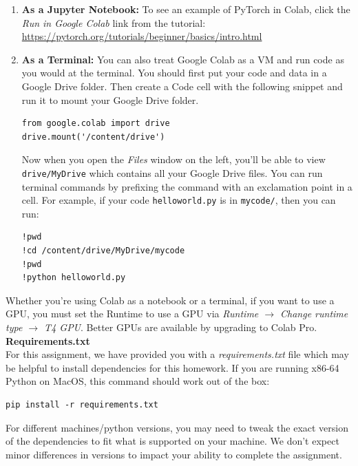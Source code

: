 \documentclass[11pt,addpoints,answers]{exam}
\begin{document}
\begin{enumerate}
\item \textbf{As a Jupyter Notebook:} To see an example of PyTorch in Colab, click the \emph{Run in Google Colab} link from the tutorial: \url{https://pytorch.org/tutorials/beginner/basics/intro.html}

\item \textbf{As a Terminal:} You can also treat Google Colab as a VM and run code as you would at the terminal. You should first put your code and data in a Google Drive folder. Then create a Code cell with the following snippet and run it to mount your Google Drive folder. 
\begin{lstlisting}
from google.colab import drive
drive.mount('/content/drive')
\end{lstlisting}
Now when you open the \emph{Files} window on the left, you'll be able to view \lstinline{drive/MyDrive}
which contains all your Google Drive files. You can run terminal commands by prefixing the command with an exclamation point in a cell. For example, if your code \lstinline{helloworld.py} is in \lstinline{mycode/}, then you can run:
\begin{lstlisting}
!pwd
!cd /content/drive/MyDrive/mycode
!pwd
!python helloworld.py
\end{lstlisting}
    
\end{enumerate}

Whether you're using Colab as a notebook or a terminal, if you want to use a GPU, you must set the Runtime to use a GPU via \emph{Runtime $\rightarrow$ Change runtime type $\rightarrow$ T4 GPU}. Better GPUs are available by upgrading to Colab Pro. \\

\textbf{Requirements.txt}\\
For this assignment, we have provided you with a \textit{requirements.txt} file which may be helpful to install dependencies for this homework. If you are running x86-64 Python on MacOS, this command should work out of the box:
\begin{lstlisting}
pip install -r requirements.txt
\end{lstlisting}
For different machines/python versions, you may need to tweak the exact version of the dependencies to fit what is supported on your machine. We don't expect minor differences in versions to impact your ability to complete the assignment.
\end{document}
